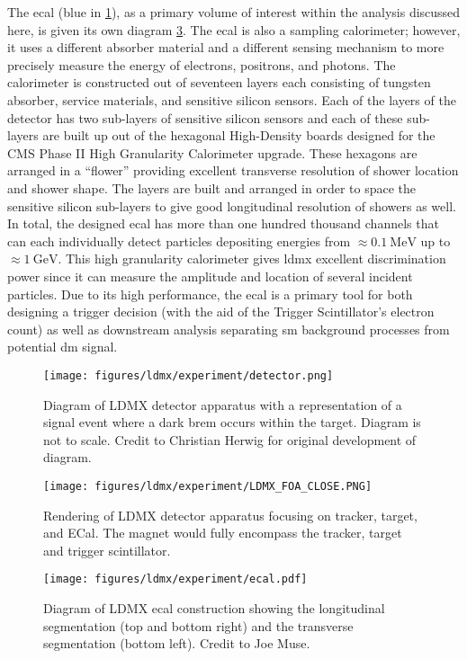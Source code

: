 The \ac{ecal} (blue in \cref{fig:ldmx-det}), as a primary volume of interest within the analysis
discussed here, is given its own diagram \cref{fig:ldmx-ecal}. The \ac{ecal} is also a sampling
calorimeter; however, it uses a different absorber material and a different sensing mechanism to
more precisely measure the energy of electrons, positrons, and photons. The calorimeter is constructed
out of seventeen layers each consisting of tungsten absorber, service materials, and sensitive silicon
sensors. Each of the layers of the detector has two sub-layers of sensitive silicon sensors and each
of these sub-layers are built up out of the hexagonal High-Density boards designed for the CMS
Phase II High Granularity Calorimeter upgrade\cite{cms-phase-2-tdr}. These hexagons are arranged in a ``flower''
providing excellent transverse resolution of shower location and shower shape. The layers are built
and arranged in order to space the sensitive silicon sub-layers to give good longitudinal resolution
of showers as well. In total, the designed \ac{ecal} has more than one hundred thousand channels that
can each individually detect particles depositing energies from $\approx \qty{0.1}{\mega\electronvolt}$ up to
$\approx\qty{1}{\giga\electronvolt}$.
This high granularity calorimeter gives \ac{ldmx} excellent discrimination power
since it can measure the amplitude and location of several incident particles.
Due to its high performance, the \ac{ecal} is a primary tool for
both designing a trigger decision (with the aid of the Trigger Scintillator's electron count) as well
as downstream analysis separating \ac{sm} background processes from potential \ac{dm} signal.

\begin{figure}
	\centering
	\texttt{[image: figures/ldmx/experiment/detector.png]}
	\caption{
		Diagram of LDMX detector apparatus with a representation of a signal event where
		a dark brem occurs within the target. Diagram is not to scale. Credit to Christian Herwig
		for original development of diagram.
	}
	\label{fig:ldmx-det}
\end{figure}

\begin{figure}
	\centering
	\texttt{[image: figures/ldmx/experiment/LDMX\_FOA\_CLOSE.PNG]}
	\caption{
		Rendering of LDMX detector apparatus focusing on tracker, target, and ECal.
		The magnet would fully encompass the tracker, target and trigger scintillator.
	}
	\label{fig:ldmx-render}
\end{figure}

\begin{figure}
	\centering
	\texttt{[image: figures/ldmx/experiment/ecal.pdf]}
	\caption{
		Diagram of LDMX \ac{ecal} construction showing the longitudinal segmentation
		(top and bottom right) and the transverse segmentation (bottom left).
		Credit to Joe Muse.
	}
	\label{fig:ldmx-ecal}
\end{figure}
